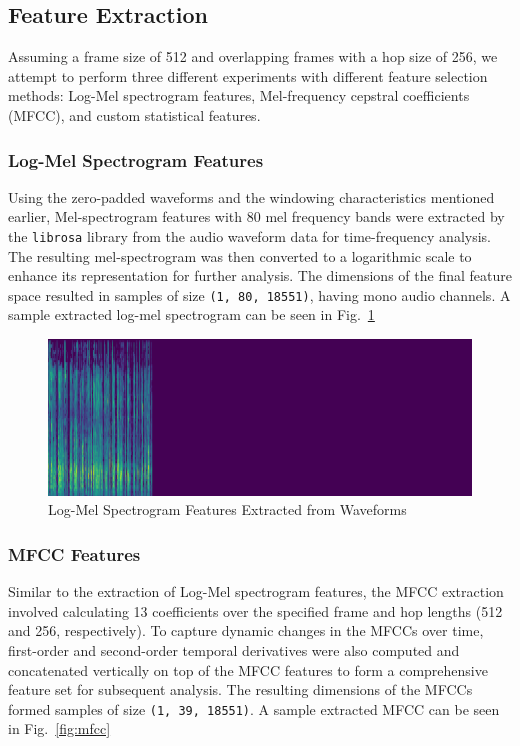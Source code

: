 \subsection{Feature Extraction}

Assuming a frame size of 512 and overlapping frames with a hop size of 256, we attempt to perform three different experiments with different feature selection methods: Log-Mel spectrogram features, Mel-frequency cepstral coefficients (MFCC), and custom statistical features.

\subsubsection{Log-Mel Spectrogram Features}

Using the zero-padded waveforms and the windowing characteristics mentioned earlier, Mel-spectrogram features with 80 mel frequency bands were extracted by the \texttt{librosa} \cite{mcfee2015librosa} library from the audio waveform data for time-frequency analysis. The resulting mel-spectrogram was then converted to a logarithmic scale to enhance its representation for further analysis. The dimensions of the final feature space resulted in samples of size \texttt{(1, 80, 18551)}, having mono audio channels. A sample extracted log-mel spectrogram can be seen in Fig.~\ref{fig:logmel}

\begin{figure}[!t]
    \centerline{\includegraphics[width=\columnwidth]{images/logmel.png}}
    \caption{Log-Mel Spectrogram Features Extracted from Waveforms}
    \label{fig:logmel}
\end{figure}

\subsubsection{MFCC Features}

Similar to the extraction of Log-Mel spectrogram features, the MFCC extraction involved calculating 13 coefficients over the specified frame and hop lengths (512 and 256, respectively). To capture dynamic changes in the MFCCs over time, first-order and second-order temporal derivatives were also computed and concatenated vertically on top of the MFCC features to form a comprehensive feature set for subsequent analysis. The resulting dimensions of the MFCCs formed samples of size \texttt{(1, 39, 18551)}. A sample extracted MFCC can be seen in Fig.~\ref{fig:mfcc}


